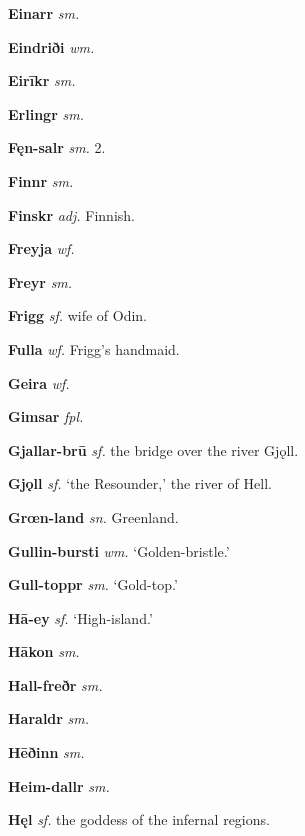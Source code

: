 \documentclass[12pt,letterpaper]{book}
\begin{document}
\vspace{\baselineskip}

\noindent
\textbf{Einarr} \textit{sm.} 

\noindent
\textbf{Eindriði} \textit{wm.} 

\noindent
\textbf{Eirīkr} \textit{sm.} 

\noindent
\textbf{Erlingr} \textit{sm.} 

\vspace{\baselineskip}

\noindent
\textbf{Fęn-salr} \textit{sm.} 2.

\noindent
\textbf{Finnr} \textit{sm.} 

\noindent
\textbf{Finskr} \textit{adj.} Finnish.

\noindent
\textbf{Freyja} \textit{wf.} 

\noindent
\textbf{Freyr} \textit{sm.} 

\noindent
\textbf{Frigg} \textit{sf.} wife of Odin.

\noindent
\textbf{Fulla} \textit{wf.} Frigg's handmaid.

\vspace{\baselineskip}

\noindent
\textbf{Geira} \textit{wf.} 

\noindent
\textbf{Gimsar} \textit{fpl.} 

\noindent
\textbf{Gjallar-brū} \textit{sf.} the bridge over the river Gjǫll.

\noindent
\textbf{Gjǫll} \textit{sf.} `the Resounder,' the river of Hell.

\noindent
\textbf{Grœn-land} \textit{sn.} Greenland.

\noindent
\textbf{Gullin-bursti} \textit{wm.} `Golden-bristle.'

\noindent
\textbf{Gull-toppr} \textit{sm.} `Gold-top.'

\vspace{\baselineskip}

\noindent
\textbf{Hā-ey} \textit{sf.} `High-island.'

\noindent
\textbf{Hākon} \textit{sm.} 

\noindent
\textbf{Hall-freðr} \textit{sm.} 

\noindent
\textbf{Haraldr} \textit{sm.} 

\noindent
\textbf{Hēðinn} \textit{sm.} 

\noindent
\textbf{Heim-dallr} \textit{sm.} 

\noindent
\textbf{Hęl} \textit{sf.} the goddess of the infernal regions.
\end{document}
